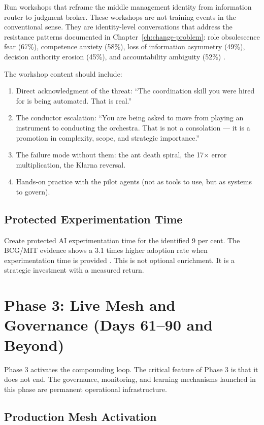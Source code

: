 Run workshops that reframe the middle management identity from information router to judgment broker. These workshops are not training events in the conventional sense. They are identity-level conversations that address the resistance patterns documented in Chapter~\ref{ch:change-problem}: role obsolescence fear (67\%), competence anxiety (58\%), loss of information asymmetry (49\%), decision authority erosion (45\%), and accountability ambiguity (52\%) \parencite{Capgemini2025}.

The workshop content should include:

\begin{enumerate}
  \item Direct acknowledgment of the threat: ``The coordination skill you were hired for is being automated. That is real.''
  \item The conductor escalation: ``You are being asked to move from playing an instrument to conducting the orchestra. That is not a consolation --- it is a promotion in complexity, scope, and strategic importance.''
  \item The failure mode without them: the ant death spiral, the 17$\times$ error multiplication, the Klarna reversal.
  \item Hands-on practice with the pilot agents (not as tools to use, but as systems to govern).
\end{enumerate}

\subsection{Protected Experimentation Time}

Create protected AI experimentation time for the identified 9 per cent. The BCG/MIT evidence shows a 3.1 times higher adoption rate when experimentation time is provided \parencite{BCGAIKPIs2025}. This is not optional enrichment. It is a strategic investment with a measured return.

\section{Phase 3: Live Mesh and Governance (Days 61--90 and Beyond)}

Phase 3 activates the compounding loop. The critical feature of Phase 3 is that it does not end. The governance, monitoring, and learning mechanisms launched in this phase are permanent operational infrastructure.

\subsection{Production Mesh Activation}

